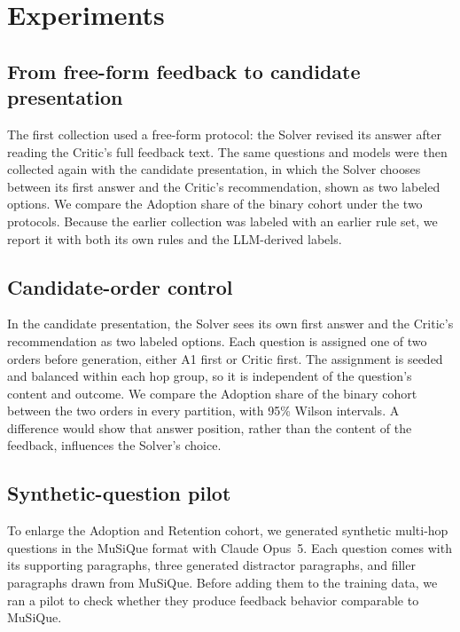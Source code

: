 \section{Experiments}
\label{sec:experiments}


\subsection{From free-form feedback to candidate presentation}
\label{sec:exp-protocol}

The first collection used a free-form protocol: the Solver revised its
answer after reading the Critic's full feedback text. The same questions and
models were then collected again with the candidate presentation, in which
the Solver chooses between its first answer and the Critic's recommendation,
shown as two labeled options. We compare the Adoption share of the binary
cohort under the two protocols. Because the earlier collection was labeled
with an earlier rule set, we report it with both its own rules and the
LLM-derived labels.

\subsection{Candidate-order control}
\label{sec:exp-order}

In the candidate presentation, the Solver sees its own first answer and the
Critic's recommendation as two labeled options. Each question is assigned
one of two orders before generation, either A1 first or Critic first. The
assignment is seeded and balanced within each hop group, so it is
independent of the question's content and outcome. We compare the Adoption
share of the binary cohort between the two orders in every partition, with
95\% Wilson intervals. A difference would show that answer position, rather
than the content of the feedback, influences the Solver's choice.

\subsection{Synthetic-question pilot}
\label{sec:exp-synthetic}

To enlarge the Adoption and Retention cohort, we generated synthetic
multi-hop questions in the MuSiQue format with Claude Opus~5. Each question
comes with its supporting paragraphs, three generated distractor
paragraphs, and filler paragraphs drawn from MuSiQue. Before adding them to
the training data, we ran a pilot to check whether they produce feedback
behavior comparable to MuSiQue.

